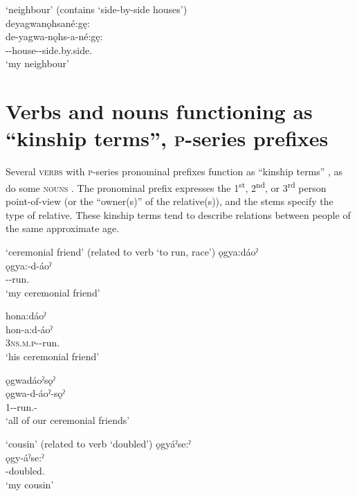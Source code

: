 \ea\label{ex:kintermppex4}  ‘neighbour’ (contains  ‘side-by-side houses’)\\
deyagwanǫhsané:gę:\\
\gll de-yagwa-nǫhs-a-né:gę:\\
 {\dualic}--house-{\joinerA}-side.by.side.{\stative}\\
\glt `my neighbour'
\z


\section{Verbs and nouns functioning as “kinship terms”, \textsc{p}-series prefixes} \label{ch:Verbs and nouns functioning as ‘kinship terms’, o-series prefixes}
Several \textsc{verbs} with \textsc{p}-series pronominal prefixes function as “kinship terms” , as do some \textsc{nouns} . The pronominal prefix expresses the 1\textsuperscript{st}, 2\textsuperscript{nd}, or 3\textsuperscript{rd} person point-of-view (or the “owner(s)” of the relative(s)), and the stems specify the type of relative. These kinship terms tend to describe relations between people of the same approximate age.

\ea\label{ex:kintermppex7}  ‘ceremonial friend’ (related to verb  ‘to run, race’)
\ea ǫgya:dáoˀ\\
\gll ǫgya:-d-áoˀ\\
 -{\semireflexive}-run.{\stative} \\
\glt `my ceremonial friend'

\ex hona:dáoˀ\\
\gll hon-a:d-áoˀ\\
 \textsc{3ns.m.p}-{\semireflexive}-run.{\stative}\\
\glt `his ceremonial friend'

\ex ǫgwadáoˀsǫˀ\\
\gll ǫgwa-d-áoˀ-sǫˀ\\
 {1\plo}-{\semireflexive}-run.{\stat}-{\pluralizer}\\
\glt `all of our ceremonial friends'
\z
\z

\ea\label{ex:kintermppex8}  ‘cousin’ (related to verb  ‘doubled’)
\ea ǫgyáˀse:ˀ\\
\gll ǫgy-áˀse:ˀ\\
 -doubled.{\stative}\\
\glt `my cousin'

